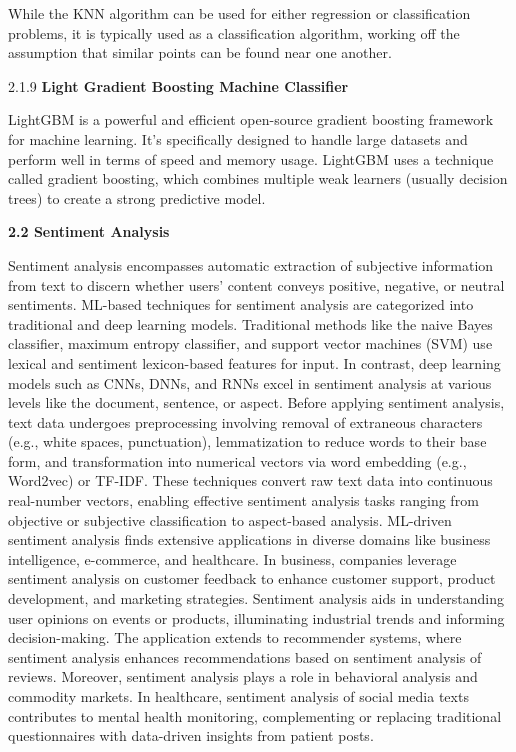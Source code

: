 \documentclass[a4paper]{article}
\theoremstyle{plain}
\theoremstyle{definition}
\begin{document}
While the KNN algorithm can be used for either regression or classification problems, it is typically used as a classification algorithm, working off the assumption that similar points can be found near one another.\newline

2.1.9  \textbf{Light Gradient Boosting Machine Classifier\newline}

LightGBM is a powerful and efficient open-source gradient boosting framework for machine learning. It’s specifically designed to handle large datasets and perform well in terms of speed and memory usage. LightGBM uses a technique called gradient boosting, which combines multiple weak learners (usually decision trees) to create a strong predictive model.\newline

\textbf{2.2 Sentiment Analysis\newline}

Sentiment analysis encompasses automatic extraction of subjective information from text to discern whether users' content conveys positive, negative, or neutral sentiments. ML-based techniques for sentiment analysis are categorized into traditional and deep learning models. Traditional methods like the naive Bayes classifier, maximum entropy classifier, and support vector machines (SVM) use lexical and sentiment lexicon-based features for input. In contrast, deep learning models such as CNNs, DNNs, and RNNs excel in sentiment analysis at various levels like the document, sentence, or aspect. Before applying sentiment analysis, text data undergoes preprocessing involving removal of extraneous characters (e.g., white spaces, punctuation), lemmatization to reduce words to their base form, and transformation into numerical vectors via word embedding (e.g., Word2vec) or TF-IDF. These techniques convert raw text data into continuous real-number vectors, enabling effective sentiment analysis tasks ranging from objective or subjective classification to aspect-based analysis.
\vspace{0.2 cm}\newline
ML-driven sentiment analysis finds extensive applications in diverse domains like business intelligence, e-commerce, and healthcare. In business, companies leverage sentiment analysis on customer feedback to enhance customer support, product development, and marketing strategies. Sentiment analysis aids in understanding user opinions on events or products, illuminating industrial trends and informing decision-making. The application extends to recommender systems, where sentiment analysis enhances recommendations based on sentiment analysis of reviews. Moreover, sentiment analysis plays a role in behavioral analysis and commodity markets. In healthcare, sentiment analysis of social media texts contributes to mental health monitoring, complementing or replacing traditional questionnaires with data-driven insights from patient posts.
\newline
\end{document}
